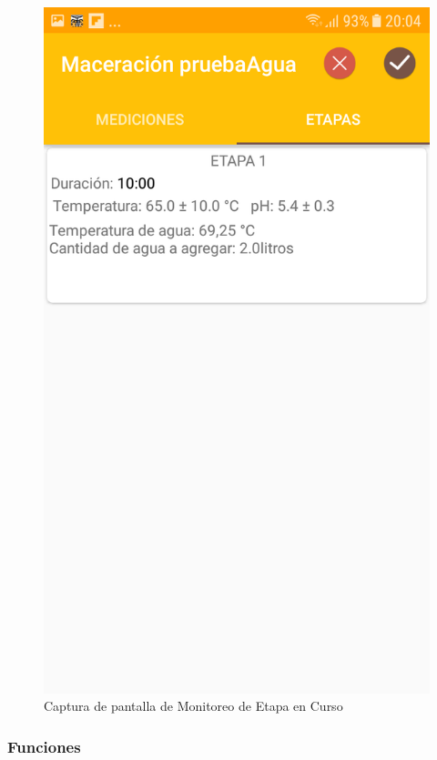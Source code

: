             \begin{figure}[h]
                \centering
                \includegraphics[scale=0.2]{software/ScreenCapture/StageFragment.jpg}
                \caption{Captura de pantalla de Monitoreo de Etapa en Curso}
                \label{fig:CapturaStageFrag}
            \end{figure}
            
            \subsubsection{Funciones}
            

